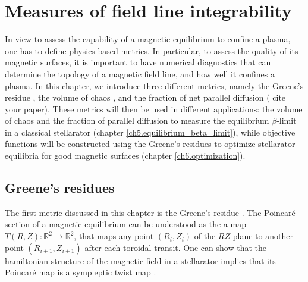 \documentclass[my_thesis.tex]{subfiles}
\begin{document}
\chapter{Measures of field line integrability} \label{ch4.diagnostics}

In view to assess the capability of a magnetic equilibrium to confine a plasma, one has to define physics based metrics. In particular, to assess the quality of its magnetic surfaces, it is important to have numerical diagnostics that can determine the topology of a magnetic field line, and how well it confines a plasma. In this chapter, we introduce three different metrics, namely the Greene's residue \citep{Greene1968,Greene1978}, the volume of chaos \citep{Loizu2017}, and the fraction of net parallel diffusion ({\color{red} cite your paper}). These metrics will then be used in different applications: the volume of chaos and the fraction of parallel diffusion to measure the equilibrium $\beta$-limit in a classical stellarator (chapter \ref{ch5.equilibrium_beta_limit}), while objective functions will be constructed using the Greene's residues to optimize stellarator equilibria for good magnetic surfaces (chapter \ref{ch6.optimization}).

\section{Greene's residues} \label{sec.greene residue}
The first metric discussed in this chapter is the Greene's residue  \citep{Greene1968,Greene1978}. The Poincar\'e section of a magnetic equilibrium can be understood as the a map $T(R,Z):\mathbb{R}^2\rightarrow\mathbb{R}^2$, that maps any point $(R_i,Z_i)$ of the $RZ$-plane to another point $(R_{i+1},Z_{i+1})$ after each toroidal transit. One can show that the hamiltonian structure of the magnetic field in a stellarator implies that its Poincar\'e map is a sympleptic twist map \citep{Meiss1992c}. 
\end{document}
